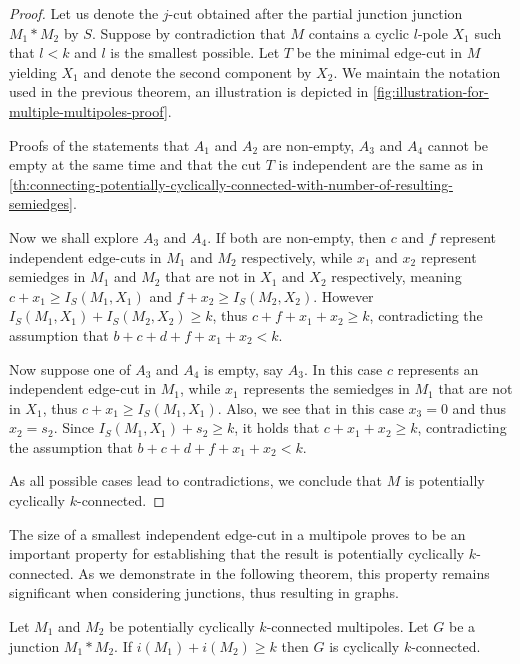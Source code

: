 \documentclass[12pt, twoside]{book}
\begin{document}
\begin{proof}
	Let us denote the $j$-cut obtained after the partial junction junction $M_1*M_2$ by $S$. Suppose by contradiction that $M$ contains a cyclic $l$-pole $X_1$ such that $l<k$ and $l$ is the smallest possible. Let $T$ be the minimal edge-cut in $M$ yielding $X_1$ and denote the second component by $X_2$. We maintain the notation used in the previous theorem, an illustration is depicted in \cref{fig:illustration-for-multiple-multipoles-proof}.
	
	Proofs of the statements that $A_1$ and $A_2$ are non-empty, $A_3$ and $A_4$ cannot be empty at the same time and that the cut $T$ is independent are the same as in \cref{th:connecting-potentially-cyclically-connected-with-number-of-resulting-semiedges}.
	
	Now we shall explore $A_3$ and $A_4$. If both are non-empty, then $c$ and $f$ represent independent edge-cuts in $M_1$ and $M_2$ respectively, while $x_1$ and $x_2$ represent semiedges in $M_1$ and $M_2$ that are not in $X_1$ and $X_2$ respectively, meaning ${c+x_1\geq I_S(M_1, X_1)}$ and ${f+x_2\geq I_S(M_2, X_2)}$. However ${I_S(M_1, X_1)+I_S(M_2, X_2)\geq k}$, thus $c+f+x_1+x_2\geq k$, contradicting the assumption that ${b+c+d+f+x_1+x_2<k}$.
	
	Now suppose one of $A_3$ and $A_4$ is empty, say $A_3$. In this case $c$ represents an independent edge-cut in $M_1$, while $x_1$ represents the semiedges in $M_1$ that are not in $X_1$, thus ${c+x_1\geq I_S(M_1, X_1)}$. Also, we see that in this case $x_3=0$ and thus $x_2=s_2$. Since ${I_S(M_1, X_1)+s_2\geq k}$, it holds that $c+x_1+x_2\geq k$, contradicting the assumption that ${b+c+d+f+x_1+x_2<k}$.
	
	As all possible cases lead to contradictions, we conclude that $M$ is potentially cyclically \mbox{$k$-connected}.
\end{proof}

The size of a smallest independent edge-cut in a multipole proves to be an important property for establishing that the result is potentially cyclically $k$-connected. As we demonstrate in the following theorem, this property remains significant when considering junctions, thus resulting in graphs.

\begin{theorem}\label{th:cyclic-edge-connectivity-of-potentially-with-independent-cuts}
	Let $M_1$ and $M_2$ be potentially cyclically $k$-connected multipoles. Let $G$ be a junction $M_1*M_2$. If $i(M_1)+i(M_2)\geq k$ then $G$ is cyclically $k$-connected.
\end{theorem}
\end{document}
